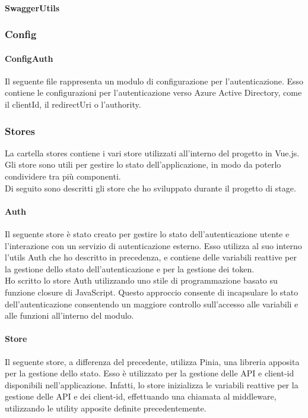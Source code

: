 \paragraph{SwaggerUtils}\label{par:swagger-utils}


\subsubsection{Config}\label{subsubsec:config}
\paragraph{ConfigAuth}\label{par:config-auth}
Il seguente file rappresenta un modulo di configurazione per l'autenticazione. Esso contiene le configurazioni per l'autenticazione verso Azure Active Directory,
come il clientId, il redirectUri o l'authority.  

\subsubsection{Stores}\label{subsubsec:store}
La cartella stores contiene i vari store utilizzati all'interno del progetto in Vue.js. Gli store sono utili per gestire lo stato dell'applicazione,
in modo da poterlo condividere tra più componenti.\\
Di seguito sono descritti gli store che ho sviluppato durante il progetto di stage.

\paragraph{Auth}\label{par:auth-store}
Il seguente store è stato creato per gestire lo stato dell'autenticazione utente e l'interazione con un servizio di autenticazione esterno.
Esso utilizza al suo interno l'utils Auth che ho descritto in precedenza, e contiene delle variabili reattive per la gestione dello stato dell'autenticazione
e per la gestione dei token.\\
Ho scritto lo store Auth utilizzando uno stile di programmazione basato su funzione closure di JavaScript. Questo approccio consente di incapsulare
lo stato dell'autenticazione consentendo un maggiore controllo sull'accesso alle variabili e alle funzioni all'interno del modulo.

\paragraph{Store}\label{par:store}
Il seguente store, a differenza del precedente, utilizza Pinia, una libreria apposita per la gestione dello stato.
Esso è utilizzato per la gestione delle API e client-id disponibili nell'applicazione. Infatti, lo store inizializza le variabili reattive per la gestione
delle API e dei client-id, effettuando una chiamata al middleware, utilizzando le utility apposite definite precedentemente.

